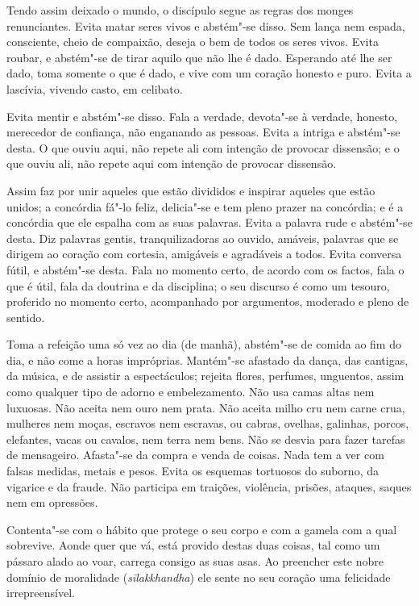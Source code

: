 
Tendo assim deixado o mundo, o discípulo segue as regras dos monges
renunciantes. Evita matar seres vivos e abstém"-se disso. Sem lança nem espada,
consciente, cheio de compaixão, deseja o bem de todos os seres vivos. Evita
roubar, e abstém"-se de tirar aquilo que não lhe é dado. Esperando até lhe ser
dado, toma somente o que é dado, e vive com um coração honesto e puro. Evita a
lascívia, vivendo casto, em celibato.

Evita mentir e abstém"-se disso. Fala a verdade, devota"-se à verdade, honesto,
merecedor de confiança, não enganando as pessoas. Evita a intriga e abstém"-se
desta. O que ouviu aqui, não repete ali com intenção de provocar dissensão; e o
que ouviu ali, não repete aqui com intenção de provocar dissensão.

Assim faz por unir aqueles que estão divididos e inspirar aqueles que estão
unidos; a concórdia fá"-lo feliz, delicia"-se e tem pleno prazer na concórdia; e é
a concórdia que ele espalha com as suas palavras. Evita a palavra rude e
abstém"-se desta. Diz palavras gentis, tranquilizadoras ao ouvido, amáveis,
palavras que se dirigem ao coração com cortesia, amigáveis e agradáveis a todos.
Evita conversa fútil, e abstém"-se desta. Fala no momento certo, de acordo com os
factos, fala o que é útil, fala da doutrina e da disciplina; o seu discurso é
como um tesouro, proferido no momento certo, acompanhado por argumentos,
moderado e pleno de sentido.

Toma a refeição uma só vez ao dia (de manhã), abstém"-se de comida ao fim do dia,
e não come a horas impróprias. Mantém"-se afastado da dança, das cantigas, da
música, e de assistir a espectáculos; rejeita flores, perfumes, unguentos, assim
como qualquer tipo de adorno e embelezamento. Não usa camas altas nem luxuosas.
Não aceita nem ouro nem prata. Não aceita milho cru nem carne crua, mulheres nem
moças, escravos nem escravas, ou cabras, ovelhas, galinhas, porcos, elefantes,
vacas ou cavalos, nem terra nem bens. Não se desvia para fazer tarefas de
mensageiro. Afasta"-se da compra e venda de coisas. Nada tem a ver com falsas
medidas, metais e pesos. Evita os esquemas tortuosos do suborno, da vigarice e
da fraude. Não participa em traições, violência, prisões, ataques, saques nem em
opressões.

Contenta"-se com o hábito que protege o seu corpo e com a gamela com a qual
sobrevive. Aonde quer que vá, está provido destas duas coisas, tal como um
pássaro alado ao voar, carrega consigo as suas asas. Ao preencher este nobre
domínio de moralidade (\emph{sīlakkhandha}) ele sente no seu coração uma
felicidade irrepreensível.

